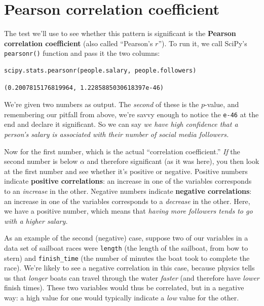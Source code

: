 \section{Pearson correlation coefficient}

The test we'll use to see whether this pattern is significant is the
\textbf{Pearson correlation coefficient} (also called ``Pearson's $r$''). To
run it, we call SciPy's \texttt{pearsonr()} function and pass it the two
columns:

\begin{Verbatim}[fontsize=\small,samepage=true,frame=single,framesep=3mm]
scipy.stats.pearsonr(people.salary, people.followers)
\end{Verbatim}
\vspace{-.2in}

\begin{Verbatim}[fontsize=\small,samepage=true,frame=leftline,framesep=5mm,framerule=1mm]
(0.2007815176819964, 1.2285885030618397e-46)
\end{Verbatim}

We're given two numbers as output. The \textit{second} of these is the
$p$-value, and remembering our pitfall from above, we're savvy enough to notice
the \texttt{e-46} at the end and declare it significant. So we can say
\textit{we have high confidence that a person's salary is associated with their
number of social media followers.}


Now for the first number, which is the actual ``correlation coefficient.''
\textit{If} the second number is below $\alpha$ and therefore significant (as
it was here), you then look at the first number and see whether it's positive
or negative. Positive numbers indicate \textbf{positive correlations}: an
increase in one of the variables corresponds to an \textit{increase} in the
other. Negative numbers indicate \textbf{negative correlations}: an increase in
one of the variables corresponds to a \textit{decrease} in the other. Here, we
have a positive number, which means that \textit{having more followers tends to
go with a higher salary.}

As an example of the second (negative) case, suppose two of our variables in a
data set of sailboat races were \texttt{length} (the length of the sailboat,
from bow to stern) and \texttt{finish\_time} (the number of minutes the boat
took to complete the race). We're likely to see a negative correlation in this
case, because physics tells us that \textit{longer} boats can travel through
the water \textit{faster} (and therefore have \textit{lower} finish times).
These two variables would thus be correlated, but in a negative way: a high
value for one would typically indicate a \textit{low} value for the other.

